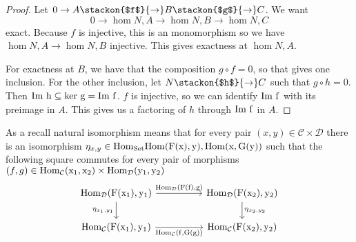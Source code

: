 \begin{proof}
     Let $0\to A\stackon{$f$}{\to} B \stackon{$g$}{\to} C$. We want \[
     0\to \hom{N,A} \to \hom{N,B}\to \hom{N,C}
     \]
     exact.
     Because $f$ is injective, this is an monomorphism so we have $\hom{N,A}\to \hom{N,B}$ injective. This gives exactness at $\hom{N,A}$.

     For exactness at $B$, we have that the composition $g\circ f=0$, so that gives one inclusion. For the other inclusion, let $N\stackon{$h$}{\to} C$ such that $g\circ h =0$. Then $\rm{Im} \ h\subseteq \rm{ker}\ g = \rm{Im} \ f$. $f$ is injective, so we can identify $\rm{Im} \ f$ with its preimage in $A$. This gives us a factoring of $h$ through $\rm{Im} \ f $ in $A$.
\end{proof}
\begin{remark}
    As a recall natural isomorphism means that for every pair $(x,y)\in \mathcal{C}\times \mathcal{D}$ there is an isomorphism  $\eta_{x,y}\in \rm{Hom}_{\rm{Set}}{\hom{F(x),y},\hom{x,G(y)}}$ such that the following square commutes for every pair of morphisms $(f,g) \in \rm{Hom}_{\mathcal{C}}(x_1,x_2)\times \rm{Hom}_{\mathcal{D}}(y_1,y_2)$
    \[\begin{tikzcd}
	{\rm{Hom}_{\mathcal{D}}(F(x_1),y_1)} && {\rm{Hom}_{\mathcal{D}}(F(x_2),y_2)} \\
	{\rm{Hom}_{\mathcal{C}}(F(x_1),y_1)} && {\rm{Hom}_{\mathcal{C}}(F(x_2),y_2)}
	\arrow["{\rm{Hom}_{\mathcal{D}}(F(f),g)}", from=1-1, to=1-3]
	\arrow["{\eta_{x_1,y_1}}"', from=1-1, to=2-1]
	\arrow["{\eta_{x_2,y_2}}", from=1-3, to=2-3]
	\arrow["{\rm{Hom}_{\mathcal{C}}(f,G(g))}"', from=2-1, to=2-3]
\end{tikzcd}\]
\end{remark}
